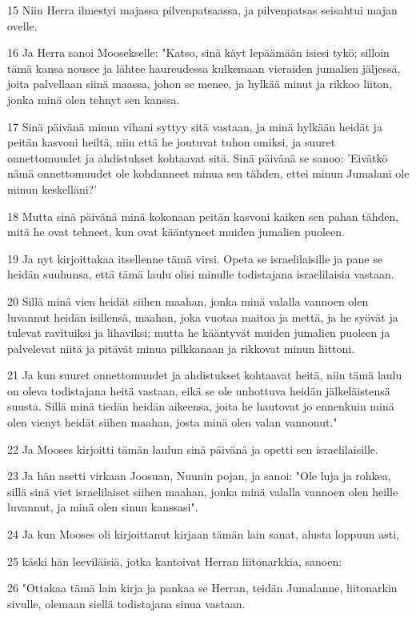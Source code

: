 \par 15 Niin Herra ilmestyi majassa pilvenpatsaassa, ja pilvenpatsas seisahtui majan ovelle.
\par 16 Ja Herra sanoi Moosekselle: "Katso, sinä käyt lepäämään isiesi tykö; silloin tämä kansa nousee ja lähtee haureudessa kulkemaan vieraiden jumalien jäljessä, joita palvellaan siinä maassa, johon se menee, ja hylkää minut ja rikkoo liiton, jonka minä olen tehnyt sen kanssa.
\par 17 Sinä päivänä minun vihani syttyy sitä vastaan, ja minä hylkään heidät ja peitän kasvoni heiltä, niin että he joutuvat tuhon omiksi, ja suuret onnettomuudet ja ahdistukset kohtaavat sitä. Sinä päivänä se sanoo: 'Eivätkö nämä onnettomuudet ole kohdanneet minua sen tähden, ettei minun Jumalani ole minun keskelläni?'
\par 18 Mutta sinä päivänä minä kokonaan peitän kasvoni kaiken sen pahan tähden, mitä he ovat tehneet, kun ovat kääntyneet muiden jumalien puoleen.
\par 19 Ja nyt kirjoittakaa itsellenne tämä virsi. Opeta se israelilaisille ja pane se heidän suuhunsa, että tämä laulu olisi minulle todistajana israelilaisia vastaan.
\par 20 Sillä minä vien heidät siihen maahan, jonka minä valalla vannoen olen luvannut heidän isillensä, maahan, joka vuotaa maitoa ja mettä, ja he syövät ja tulevat ravituiksi ja lihaviksi; mutta he kääntyvät muiden jumalien puoleen ja palvelevat niitä ja pitävät minua pilkkanaan ja rikkovat minun liittoni.
\par 21 Ja kun suuret onnettomuudet ja ahdistukset kohtaavat heitä, niin tämä laulu on oleva todistajana heitä vastaan, eikä se ole unhottuva heidän jälkeläistensä suusta. Sillä minä tiedän heidän aikeensa, joita he hautovat jo ennenkuin minä olen vienyt heidät siihen maahan, josta minä olen valan vannonut."
\par 22 Ja Mooses kirjoitti tämän laulun sinä päivänä ja opetti sen israelilaisille.
\par 23 Ja hän asetti virkaan Joosuan, Nuunin pojan, ja sanoi: "Ole luja ja rohkea, sillä sinä viet israelilaiset siihen maahan, jonka minä valalla vannoen olen heille luvannut, ja minä olen sinun kanssasi".
\par 24 Ja kun Mooses oli kirjoittanut kirjaan tämän lain sanat, alusta loppuun asti,
\par 25 käski hän leeviläisiä, jotka kantoivat Herran liitonarkkia, sanoen:
\par 26 "Ottakaa tämä lain kirja ja pankaa se Herran, teidän Jumalanne, liitonarkin sivulle, olemaan siellä todistajana sinua vastaan.
